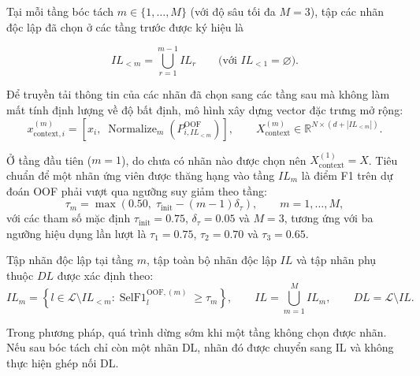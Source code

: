 \documentclass[11pt,a4paper]{article}
\begin{document}
Tại mỗi tầng bóc tách \(m \in \{1, \ldots, M\}\) (với độ sâu tối đa \(M=3\)), tập các nhãn độc lập đã chọn ở các tầng trước được ký hiệu là

\begin{equation}
IL_{<m} = \bigcup_{r=1}^{m-1} IL_r
\qquad \bigl(\text{với } IL_{<1} = \varnothing\bigr).
\end{equation}

Để truyền tải thông tin của các nhãn đã chọn sang các tầng sau mà không làm mất tính định lượng về độ bất định, mô hình xây dựng vector đặc trưng mở rộng:
\begin{equation}
x_{\mathrm{context},i}^{(m)} = \left[x_i, \; \operatorname{Normalize}_m\left(P^{\mathrm{OOF}}_{i,IL_{<m}}\right)\right], \qquad X_{\mathrm{context}}^{(m)} \in \mathbb{R}^{N \times (d + |IL_{<m}|)}.
\label{eq:context}
\end{equation}

Ở tầng đầu tiên (\(m=1\)), do chưa có nhãn nào được chọn nên \(X_{\mathrm{context}}^{(1)} = X\). Tiêu chuẩn để một nhãn ứng viên được thăng hạng vào tầng \(IL_m\) là điểm F1 trên dự đoán OOF phải vượt qua ngưỡng suy giảm theo tầng:
\begin{equation}
\tau_m = \max\left(0.50, \; \tau_{\mathrm{init}} - (m-1)\delta_\tau\right), \qquad m=1, \ldots, M,
\label{eq:peel-thresh}
\end{equation}
với các tham số mặc định \(\tau_{\mathrm{init}} = 0.75\), \(\delta_\tau = 0.05\) và \(M = 3\), tương ứng với ba ngưỡng hiệu dụng lần lượt là \(\tau_1 = 0.75\), \(\tau_2 = 0.70\) và \(\tau_3 = 0.65\).

Tập nhãn độc lập tại tầng \(m\), tập toàn bộ nhãn độc lập \(IL\) và tập nhãn phụ thuộc \(DL\) được xác định theo:
\begin{equation}
IL_m = \left\{ l \in \mathcal L \setminus IL_{<m} : \operatorname{SelF1}_{l}^{\mathrm{OOF},(m)} \ge \tau_m \right\}, \qquad IL = \bigcup_{m=1}^{M} IL_m, \qquad DL = \mathcal L \setminus IL.
\label{eq:il-dl}
\end{equation}

Trong phương pháp, quá trình dừng sớm khi một tầng không chọn được nhãn. Nếu sau bóc tách chỉ còn một nhãn DL, nhãn đó được chuyển sang IL và không thực hiện ghép nối DL.
\end{document}
